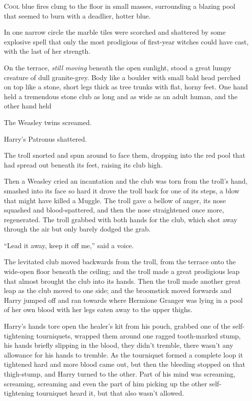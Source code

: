 
\lettrine{C}{ool} blue fires
clung to the floor in small masses, surrounding a blazing pool that seemed to burn with a deadlier, hotter blue.

In one narrow circle the marble tiles were scorched and shattered by some explosive spell that only the most prodigious of first-year witches could have cast, with the last of her strength.

On the terrace, \emph{still moving} beneath the open sunlight, stood a great lumpy creature of dull granite-grey. Body like a boulder with small bald head perched on top like a stone, short legs thick as tree trunks with flat, horny feet. One hand held a tremendous stone club as long and as wide as an adult human, and the other hand held 

The Weasley twins screamed.

Harry’s Patronus shattered.

The troll snorted and spun around to face them, dropping  into the red pool that had spread out beneath its feet, raising its club high.

Then a Weasley cried an incantation and the club was torn from the troll’s hand, smashed into its face so hard it drove the troll back for one of its steps, a blow that might have killed a Muggle. The troll gave a bellow of anger, its nose squashed and blood-spattered, and then the nose straightened once more, regenerated. The troll grabbed with both hands for the club, which shot away through the air but only barely dodged the grab.

“Lead it away, keep it off me,” said a voice.

The levitated club moved backwards from the troll, from the terrace onto the wide-open floor beneath the ceiling; and the troll made a great prodigious leap that almost brought the club into its hands. Then the troll made another great leap as the club moved to one side; and the broomstick moved forwards and Harry jumped off and ran towards where Hermione Granger was lying in a pool of her own blood with her legs eaten away to the upper thighs.

Harry’s hands tore open the healer’s kit from his pouch, grabbed one of the self-tightening tourniquets, wrapped them around one ragged tooth-marked stump, his hands briefly slipping in the blood, they didn’t tremble, there wasn’t any allowance for his hands to tremble. As the tourniquet formed a complete loop it tightened hard and more blood came out, but then the bleeding stopped on that thigh-stump, and Harry turned to the other. Part of his mind was screaming, screaming, screaming and even the part of him picking up the other self-tightening tourniquet heard it, but that also wasn’t allowed.

